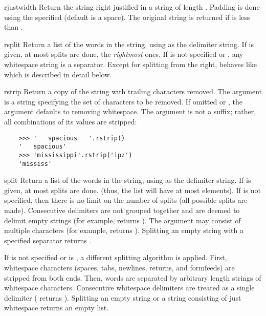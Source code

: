 \begin{methoddesc}[string]{rjust}{width}
Return the string right justified in a string of length .
Padding is done using the specified  (default is a space).
The original string is returned if
 is less than .
\end{methoddesc}

\begin{methoddesc}[string]{rsplit}{}
Return a list of the words in the string, using  as the
delimiter string.  If  is given, at most 
splits are done, the \emph{rightmost} ones.  If  is not specified
or , any whitespace string is a separator.  Except for splitting
from the right,  behaves like  which
is described in detail below.
\end{methoddesc}

\begin{methoddesc}[string]{rstrip}{}
Return a copy of the string with trailing characters removed.  The
 argument is a string specifying the set of characters
to be removed.  If omitted or , the  argument
defaults to removing whitespace.  The  argument is not
a suffix; rather, all combinations of its values are stripped:
\begin{verbatim}
    >>> '   spacious   '.rstrip()
    '   spacious'
    >>> 'mississippi'.rstrip('ipz')
    'mississ'
\end{verbatim}
\end{methoddesc}

\begin{methoddesc}[string]{split}{}
Return a list of the words in the string, using  as the
delimiter string.  If  is given, at most 
splits are done. (thus, the list will have at most 
elements).  If  is not specified, then there
is no limit on the number of splits (all possible splits are made).
Consecutive delimiters are not grouped together and are
deemed to delimit empty strings (for example, 
returns \samp{['1', '', '2']}).  The  argument may consist of
multiple characters (for example,  returns
\samp{['1', '2', '3']}).  Splitting an empty string with a specified
separator returns \samp{['']}.

If  is not specified or is , a different splitting
algorithm is applied.  First, whitespace characters (spaces, tabs,
newlines, returns, and formfeeds) are stripped from both ends.  Then,
words are separated by arbitrary length strings of whitespace
characters. Consecutive whitespace delimiters are treated as a single
delimiter ( returns \samp{['1', '2', '3']}).
Splitting an empty string or a string consisting of just whitespace
returns an empty list.
\end{methoddesc}

